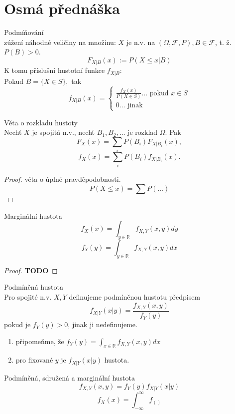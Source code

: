 \documentclass[../main.tex]{subfiles}
\begin{document}
\section{Osmá přednáška}

\begin{definition}
    Podmíňování\\

    zúžení náhodné veličiny na množinu: $X$ je n.v. na $(\Omega, \mathcal{F},P), B \in \mathcal{F}$, t. ž. $P(B) >0$.
    \[F_{X|B}(x):= P(X \leq x |B)\]
    K tomu příslušní hustotní funkce $f_{X|B}$:\\
    Pokud $B = \{X\in S\},$ tak 
    \[f_{X|B}(x) = 
    \begin{cases}    
        \frac{f_X(x)}{P(X\in S)} \dots \text{ pokud } x\in S\\
        0 \dots \text{ jinak }
    \end{cases}\]
\end{definition}
\begin{theorem}
    Věta o rozkladu hustoty\\

    Nechť $X$ je spojitá n.v., nechť $B_1,B_2,\dots$ je rozklad $\Omega$. Pak
    \[F_X(x) = \sum_i P(B_i)F_{X|B_i}(x),\]
    \[f_X(x) = \sum_i P(B_i)f_{X|B_i}(x).\]
    \begin{proof}
        věta o úplné pravděpodobnosti. 
        \[P(X\leq x) = \sum P(\dots)\]
    \end{proof}
\end{theorem}

\begin{theorem}
    Marginální hustota\\

    \[f_X(x) = \int_{y\in \mathbb{R}} f_{X,Y}(x,y)dy\]
    \[f_Y(y) = \int_{y\in \mathbb{R}} f_{X,Y}(x,y)dx\]
\end{theorem}
\begin{proof}
    \textbf{TODO}
\end{proof}

\begin{definition}
    Podmíněná hustota\\

    Pro spojité n.v. $X,Y$ definujeme podmíněnou hustotu předpisem
    \[f_{X|Y}(x|y) = \frac{f_{X,Y}(x,y)}{f_{Y}(y)}\]
    pokud je $f_Y(y) > 0$, jinak ji nedefinujeme.
    \begin{enumerate}
        \item připomeňme, že $f_Y(y) = \int_{x\in \mathbb{R}}f_{X,Y}(x,y)dx$
        \item pro fixované $y$ je $f_{X|Y}(x|y)$ hustota.
    \end{enumerate}
\end{definition}
\begin{theorem}
    Podmíněná, sdružená a marginální hustota\\

    \[f_{X,Y}(x,y) = f_Y(y)f_{X|Y}(x|y)\]
    \[f_X(x) = \int^\infty_{-\infty} f_()\]
\end{theorem}
\end{document}
